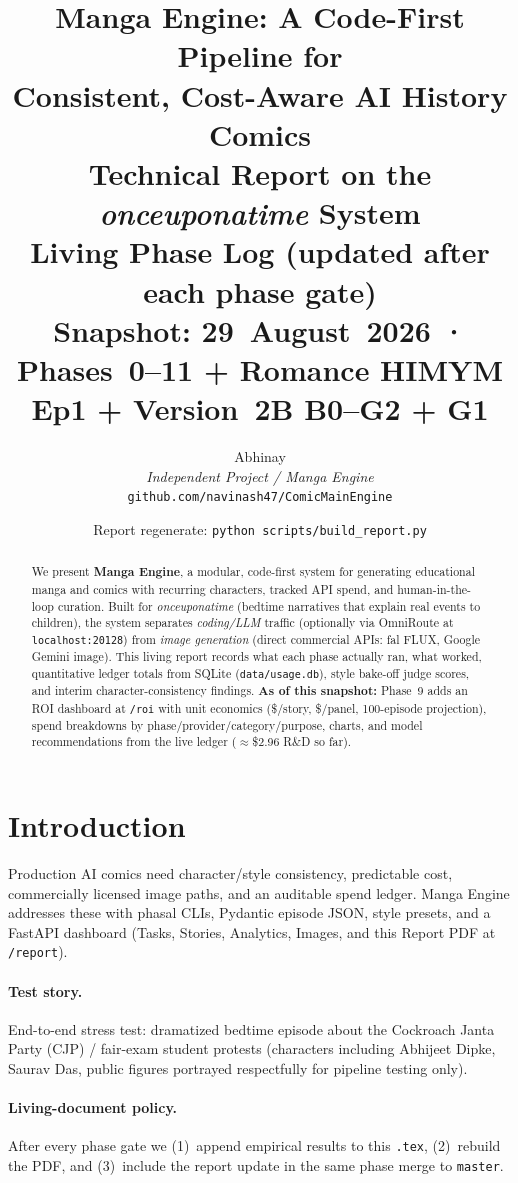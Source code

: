 \documentclass[10pt,twocolumn,letterpaper]{article}
\title{\vspace{-1.2em}
\textbf{Manga Engine: A Code-First Pipeline for\\
Consistent, Cost-Aware AI History Comics}\\[0.4em]
\large Technical Report on the \emph{onceuponatime} System\\[0.3em]
\normalsize Living Phase Log (updated after each phase gate)\\[0.2em]
\normalsize Snapshot: 29~August~2026 · Phases~0--11 + Romance HIMYM Ep1 + Version~2B B0--G2 + G1
\vspace{-0.6em}}
\author{
Abhinay\\
\textit{Independent Project / Manga Engine}\\
\texttt{github.com/navinash47/ComicMainEngine}
}
\date{Report regenerate: \texttt{python scripts/build\_report.py}}
\begin{document}
\maketitle
\thispagestyle{empty}

\begin{abstract}
We present \textbf{Manga Engine}, a modular, code-first system for generating educational manga and comics with recurring characters, tracked API spend, and human-in-the-loop curation.
Built for \emph{onceuponatime} (bedtime narratives that explain real events to children), the system separates \emph{coding/LLM} traffic (optionally via OmniRoute at \texttt{localhost:20128}) from \emph{image generation} (direct commercial APIs: fal FLUX, Google Gemini image).
This living report records what each phase actually ran, what worked, quantitative ledger totals from SQLite (\texttt{data/usage.db}), style bake-off judge scores, and interim character-consistency findings.
\textbf{As of this snapshot:} Phase~9 adds an ROI dashboard at \texttt{/roi} with unit economics (\$/story, \$/panel, 100-episode projection), spend breakdowns by phase/provider/category/purpose, charts, and model recommendations from the live ledger ($\approx$\$2.96 R\&D so far).
\end{abstract}

\section{Introduction}
Production AI comics need character/style consistency, predictable cost, commercially licensed image paths, and an auditable spend ledger.
Manga Engine addresses these with phasal CLIs, Pydantic episode JSON, style presets, and a FastAPI dashboard (Tasks, Stories, Analytics, Images, and this Report PDF at \texttt{/report}).

\paragraph{Test story.}
End-to-end stress test: dramatized bedtime episode about the Cockroach Janta Party (CJP) / fair-exam student protests (characters including Abhijeet Dipke, Saurav Das, public figures portrayed respectfully for pipeline testing only).

\paragraph{Living-document policy.}
After every phase gate we (1)~append empirical results to this \texttt{.tex}, (2)~rebuild the PDF, and (3)~include the report update in the same phase merge to \texttt{master}.
\end{document}
